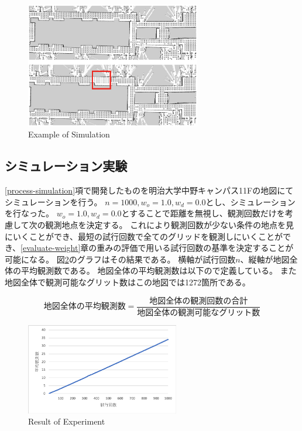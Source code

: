 \documentclass{jsarticle}
\begin{document}
\begin{figure}[tbh]
 \centering
  \includegraphics[height=55mm]{fig/example.eps}
  \vspace*{-4mm}
  \caption{Example of Simulation}
  \label{fig: example of simulation}
\end{figure}

\subsection{シミュレーション実験}
\label{run-simulation}
\ref{process-simulation}項で開発したものを明治大学中野キャンパス11Fの地図にてシミュレーションを行う。
$n=1000,w_o=1.0,w_d=0.0$とし、シミュレーションを行なった。
$w_o=1.0,w_d=0.0$とすることで距離を無視し、観測回数だけを考慮して次の観測地点を決定する。
これにより観測回数が少ない条件の地点を見にいくことができ、最短の試行回数で全てのグリッドを観測しにいくことができ、\ref{evaluate-weight}章の重みの評価で用いる試行回数の基準を決定することが可能になる。
図\ref{fig: result of experiments}のグラフはその結果である。
横軸が試行回数$n$、縦軸が地図全体の平均観測数である。
地図全体の平均観測数は以下ので定義している。
また地図全体で観測可能なグリット数はこの地図では1272箇所である。

\begin{equation}
  地図全体の平均観測数 = \frac{地図全体の観測回数の合計}{地図全体の観測可能なグリット数}
	\label{eqn: average-in-map}
\end{equation}

\begin{figure}[tbh]
 \centering
  \includegraphics[height=40mm]{fig/n1000.eps}
  \vspace*{-4mm}
  \caption{Result of Experiment}
  \label{fig: result of experiments}
\end{figure}
\end{document}
